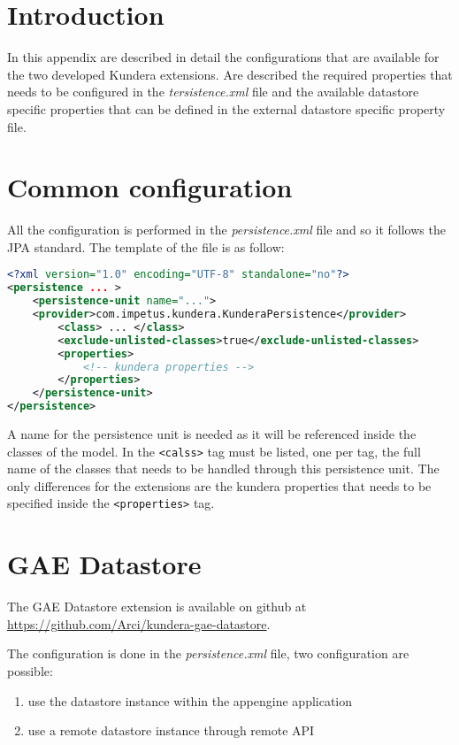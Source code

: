 \section{Introduction}
In this appendix are described in detail the configurations that are available for the two developed Kundera extensions.
Are described the required properties that needs to be configured in the \textit{tersistence.xml} file and the available datastore specific properties that can be defined in the external datastore specific property file.

\section{Common configuration}
All the configuration is performed in the \textit{persistence.xml} file and so it follows the JPA standard.
The template of the file is as follow:

\begin{lstlisting}[language=XML, caption=persistence.xml template]
<?xml version="1.0" encoding="UTF-8" standalone="no"?>
<persistence ... >
    <persistence-unit name="...">
    <provider>com.impetus.kundera.KunderaPersistence</provider>
        <class> ... </class>
        <exclude-unlisted-classes>true</exclude-unlisted-classes>
        <properties>
            <!-- kundera properties -->
        </properties>
    </persistence-unit>
</persistence>
\end{lstlisting}

\noindent A name for the persistence unit is needed as it will be referenced inside the classes of the model.
In the \texttt{<calss>} tag must be listed, one per tag, the full name of the classes that needs to be handled through this persistence unit.
The only differences for the extensions are the kundera properties that needs to be specified inside the \texttt{<properties>} tag.

\section{GAE Datastore}
\label{appendix:datastore-config}
The GAE Datastore extension is available on github at \url{https://github.com/Arci/kundera-gae-datastore}.

\newparagraph The configuration is done in the \textit{persistence.xml} file, two configuration are possible:
\begin{enumerate}
\item use the datastore instance within the appengine application
\item use a remote datastore instance through remote API
\end{enumerate}

